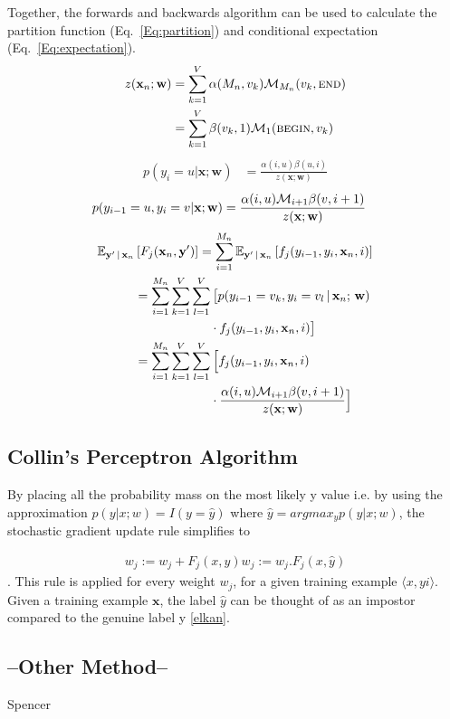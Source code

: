 \documentclass[10pt,twocolumn,letterpaper]{article}
\newcommand{\x}{\mathbf{x}}
\newcommand{\y}{\mathbf{y}}
\newcommand{\w}{\mathbf{w}}
\begin{document}
Together, the forwards and backwards algorithm can be used to calculate the partition function (Eq.\ \ref{Eq:partition}) and conditional expectation (Eq.\ \ref{Eq:expectation}).
\begin{align}
	z(\x_n;\w) &= \sum_{k=1}^V \alpha(M_n, v_k) \M_{M_n}(v_k,\mbox{\textsc{end}}) \\
	&= \sum_{k=1}^V \beta(v_k, 1)  \M_1(\mbox{\textsc{begin}}, v_k)
\end{align}
\begin{align}
	p(y_i = u | \x; \w) &= \frac{\alpha(i,u)\beta(u,i)}{z(\x;\w)}
\end{align}
\begin{align}
	p(y_{i-1}=u,y_i=v|\x;\w) &= \frac{\alpha(i,u)\M_{i+1}\beta(v,i+1)}{z(\x;\w)}
\end{align}
\begin{align}
	\mathbb{E}_{\y'\,|\,\x_n} & \left[ F_j(\x_n, \y' ) \right] 
		= \sum_{i=1}^{M_n} \mathbb{E}_{\y'\,|\,\x_n} \left[f_j(y_{i-1},y_i,\x_n, i ) \right] \\
		&= \sum_{i=1}^{M_n} \sum_{k=1}^V \sum_{l=1}^V \big[ p(y_{i-1}=v_k,y_i=v_l\,|\,\x_n ;\,\w) \notag \\
		& \hspace{6 em} \cdot f_j(y_{i-1},y_i,\x_n, i ) \big] \\
		&= \sum_{i=1}^{M_n} \sum_{k=1}^V \sum_{l=1}^V \Big[ f_j(y_{i-1},y_i,\x_n, i ) \notag \\
		& \hspace{6 em} \cdot  \frac{\alpha(i,u)\M_{i+1}\beta(v,i+1)}{z(\x;\w)} \Big]
\end{align}

\subsection{Collin's Perceptron Algorithm}
By placing all the probability mass on the most likely y value i.e. 
by using the approximation $p(y|x;w) = I(y = \hat{y})$ where $\hat{y}=argmax_y p(y|x;w)$,
the stochastic gradient update rule simplifies to 

\begin{align}
	w_j := w_j + F_j(x, y)
	w_j := w_j . F_j(x, \hat{y})
\end{align}.
This rule is applied for every weight $w_j$, for a given training example $\langle x, yi\rangle$. Given
a training example $\x$, the label $\hat{y}$ can be thought of as an impostor compared to
the genuine label y \ref{elkan}.

\subsection{--Other Method--}
Spencer
\end{document}
